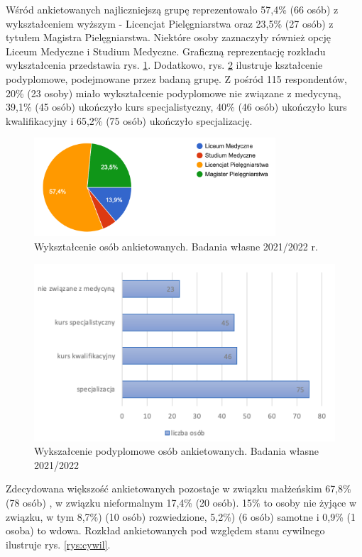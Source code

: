\documentclass[a4paper,12pt,twoside,openright]{mwrep}
\begin{document}
Wśród ankietowanych najliczniejszą grupę reprezentowało 57,4\% (66 osób) z wykształceniem wyższym - Licencjat Pielęgniarstwa oraz  23,5\%  (27 osób) z tytułem Magistra Pielęgniarstwa. Niektóre osoby zaznaczyły również opcję Liceum Medyczne i  Studium Medyczne. Graficzną reprezentację rozkładu wykształcenia przedstawia rys. \ref{rys:wykszt}. Dodatkowo, rys. \ref{rys:podyplom} ilustruje kształcenie podyplomowe, podejmowane przez badaną grupę. Z pośród 115 respondentów, 20\% (23 osoby) miało wykształcenie podyplomowe nie związane z medycyną, 39,1\% (45 osób) ukończyło kurs specjalistyczny, 40\% (46 osób) ukończyło kurs kwalifikacyjny i 
65,2\% (75 osób) ukończyło specjalizację.  


\begin{figure}[H]
\centering
\includegraphics[width=9cm]{char_gr_bad/wyksztalc00}
\caption{Wykształcenie osób ankietowanych. Badania własne 2021/2022 r.}
\label{rys:wykszt}
\end{figure}

\begin{figure}[H]
\centering
\includegraphics[width=13cm]{char_gr_bad/podyplom01}
\caption{Wykszałcenie podyplomowe osób ankietowanych. Badania własne 2021/2022}
\label{rys:podyplom}
\end{figure}


Zdecydowana większość ankietowanych pozostaje  w związku małżeńskim 67,8\%  (78 osób) , w związku nieformalnym 17,4\% (20 osób). 15\% to osoby nie żyjące w związku, w tym  8,7\%) (10 osób) rozwiedzione,  5,2\%) (6 osób) samotne i 0,9\%  (1 osoba)  to wdowa. Rozkład ankietowanych pod względem stanu cywilnego ilustruje rys. \ref{rys:cywil}.
\end{document}

